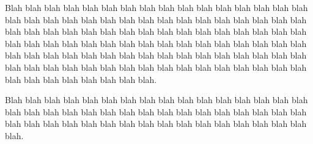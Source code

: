 \documentclass{SFLetter}
\date{32nd Never 2063}
\begin{document}
\maketitle

Blah blah blah blah blah blah blah blah blah blah blah blah blah blah blah blah blah blah blah blah blah blah blah blah blah blah blah blah blah blah blah blah blah blah blah blah blah blah blah blah blah blah blah blah blah blah blah blah blah blah blah blah blah blah blah blah blah blah blah blah blah blah blah blah blah blah blah blah blah blah blah blah blah blah blah blah blah blah blah blah blah blah blah blah blah blah blah blah blah blah blah blah blah blah blah blah blah blah blah blah blah blah blah blah.

Blah blah blah blah blah blah blah blah blah blah blah blah blah blah blah blah blah blah blah blah blah blah blah blah blah blah blah blah blah blah blah blah blah blah blah blah blah blah blah blah blah blah blah blah blah blah blah blah blah.

\makeclosing
\end{document}
